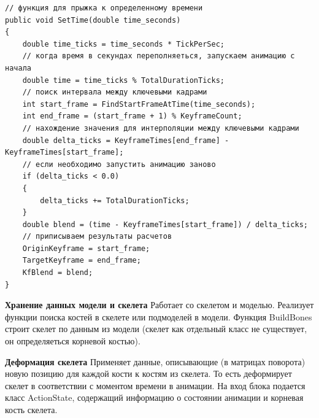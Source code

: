 \begin{verbatim}
// функция для прыжка к определенному времени
public void SetTime(double time_seconds)
{            
    double time_ticks = time_seconds * TickPerSec;
    // когда время в секундах переполняеться, запускаем анимацию с начала
    double time = time_ticks % TotalDurationTicks;
    // поиск интервала между ключевыми кадрами
    int start_frame = FindStartFrameAtTime(time_seconds);
    int end_frame = (start_frame + 1) % KeyframeCount;
    // нахождение значения для интерполяции между ключевыми кадрами
    double delta_ticks = KeyframeTimes[end_frame] - KeyframeTimes[start_frame];
    // если необходимо запустить анимацию заново
    if (delta_ticks < 0.0)
    {
        delta_ticks += TotalDurationTicks;
    }
    double blend = (time - KeyframeTimes[start_frame]) / delta_ticks;
    // приписываем результаты расчетов
    OriginKeyframe = start_frame;
    TargetKeyframe = end_frame;
    KfBlend = blend;
}
\end{verbatim}


\textbf{Хранение данных модели и скелета}
Работает со скелетом и моделью.
Реализует функции поиска костей в скелете или подмоделей в модели.
Функция BuildBones строит скелет по данным из модели (скелет как отдельный класс не существует, он определяеться корневой костью).


\textbf{Деформация скелета}
Применяет данные, описывающие (в матрицах поворота) новую позицию для каждой кости к костям из скелета.
То есть деформирует скелет в соответствии с моментом времени в анимации. На вход блока подается класс ActionState, содержащий информацию о состоянии анимации и корневая кость скелета.

